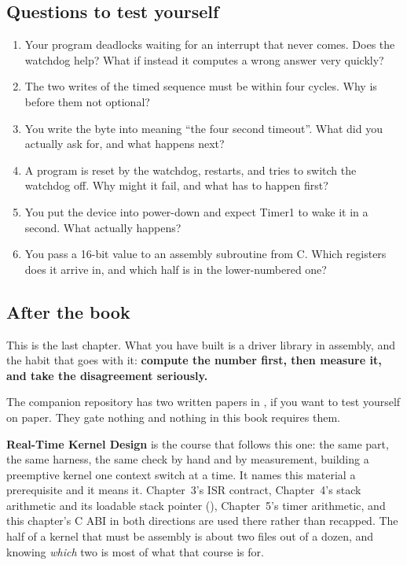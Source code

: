 \subsection*{Questions to test yourself}
\begin{enumerate}
  \item Your program deadlocks waiting for an interrupt that never comes. Does the watchdog help?
    What if instead it computes a wrong answer very quickly?
  \item The two writes of the timed sequence must be within four cycles. Why is  before
    them not optional?
  \item You write the byte  into  meaning ``the four second timeout''. What
    did you actually ask for, and what happens next?
  \item A program is reset by the watchdog, restarts, and tries to switch the watchdog off. Why
    might it fail, and what has to happen first?
  \item You put the device into power-down and expect Timer1 to wake it in a second. What actually
    happens?
  \item You pass a 16-bit value to an assembly subroutine from C. Which registers does it arrive in,
    and which half is in the lower-numbered one?
\end{enumerate}

\subsection*{After the book}
This is the last chapter. What you have built is a driver library in assembly, and the habit that
goes with it: \textbf{compute the number first, then measure it, and take the disagreement
seriously.}

The companion repository has two written papers in , if you want to test yourself on
paper. They gate nothing and nothing in this book requires them.

\textbf{Real-Time Kernel Design} is the course that follows this one: the same part, the same
harness, the same check by hand and by measurement, building a preemptive kernel one context switch
at a time. It names this material a prerequisite and it means it. Chapter~3's ISR contract,
Chapter~4's stack arithmetic and its loadable stack pointer (), Chapter~5's
timer arithmetic, and this chapter's C ABI in both directions are used there rather than recapped.
The half of a kernel that must be assembly is about two files out of a dozen, and knowing
\emph{which} two is most of what that course is for.
